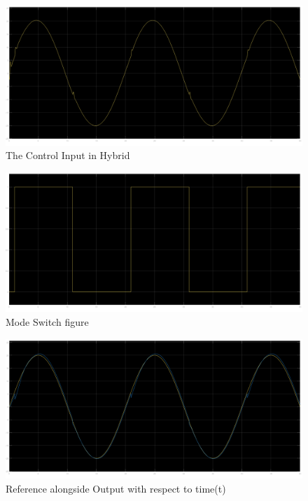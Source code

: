 \documentclass{article}
\begin{document}
\begin{figure}[htbp]
    \centering
    \includegraphics[width=\linewidth]{images/Control_Input_Hybrid.png}
    \caption{The Control Input in Hybrid}
    \label{fig:ControlInputHybrid}
\end{figure}

\begin{figure}[htbp]
    \centering
    \includegraphics[width=\linewidth]{images/ModeSwitch.png}
    \caption{Mode Switch figure}
    \label{fig:Switch}
\end{figure}

\begin{figure}[htbp]
    \centering
    \includegraphics[width=\linewidth]{images/RefWithRespecttoOutput.png}
    \caption{Reference alongside Output with respect to time(t)}
    \label{fig:Ref2Output}
\end{figure}
\end{document}
